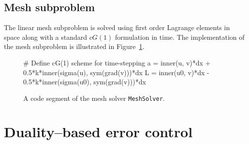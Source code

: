 \newpage
\subsection{Mesh subproblem}

The linear mesh subproblem is solved using first order Lagrange
elements in space along with a standard $cG(1)$ formulation in time.
The implementation of the mesh subproblem is illustrated in
Figure~\ref{selim:fig:meshsolver}.
\begin{figure}
\caption{A code segment of the mesh solver \texttt{MeshSolver}.}
\label{selim:fig:meshsolver}
\begin{python}
  # Define cG(1) scheme for time-stepping
  a = inner(u, v)*dx + 0.5*k*inner(sigma(u), sym(grad(v)))*dx
  L = inner(u0, v)*dx - 0.5*k*inner(sigma(u0), sym(grad(v)))*dx
\end{python}
\end{figure}

\section{Duality--based error control}

